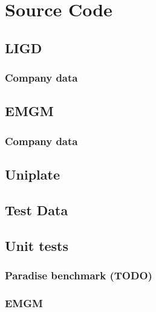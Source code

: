 \chapter{Source Code}

\lstset{frame=none}
\section{LIGD}

\subsection{Company data}

\section{EMGM}

\subsection{Company data}

\section{Uniplate}

\section{Test Data}

\section{Unit tests}
\subsection{Paradise benchmark (TODO)}

\subsection{EMGM}

